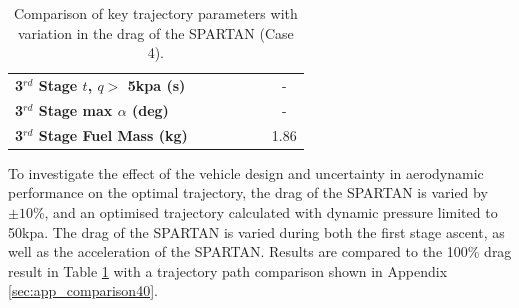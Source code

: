 \begin{table}[ht!]
\begin{tabular}{l c c c c c c}
		\textbf{3$^{rd}$ Stage $t$, $q >$ 5kpa (s)}
		& \thirdqOverFiveCdNinetyNoReturn
		& \thirdqOverFiveCdNinetyFiveNoReturn
		& \thirdqOverFiveCdStandardNoReturn
		& \thirdqOverFiveCdOneHundredFiveNoReturn
		& \thirdqOverFiveCdOneHundredTenNoReturn
		& -
		\\
		\textbf{3$^{rd}$ Stage max $\alpha$ (deg)}
		& \thirdmaxAoACdNinetyNoReturn
		& \thirdmaxAoACdNinetyFiveNoReturn
		& \thirdmaxAoACdStandardNoReturn
		& \thirdmaxAoACdOneHundredFiveNoReturn
		& \thirdmaxAoACdOneHundredTenNoReturn
		& -
		\\
		\textbf{3$^{rd}$ Stage Fuel Mass (kg)}
		& \thirdmFuelCdNinetyNoReturn
		& \thirdmFuelCdNinetyFiveNoReturn
		& \thirdmFuelCdStandardNoReturn
		& \thirdmFuelCdOneHundredFiveNoReturn
		& \thirdmFuelCdOneHundredTenNoReturn
		&1.86
		\\
		\hline 
	\end{tabular} 
	\caption{Comparison of key trajectory parameters with variation in the drag of the SPARTAN (Case 4).}
	\label{tab:DragVariationNoReturn}
\end{table}

To investigate the effect of the vehicle design and uncertainty in aerodynamic performance on the optimal trajectory, the drag of the SPARTAN is varied by $\pm10$\%, and an optimised trajectory calculated with dynamic pressure limited to 50kpa. The drag of the SPARTAN is varied during both the first stage ascent, as well as the acceleration of the SPARTAN. Results are compared to the 100\% drag result in Table \ref{tab:DragVariationNoReturn} with a trajectory path comparison shown in Appendix \ref{sec:app_comparison40}. 

